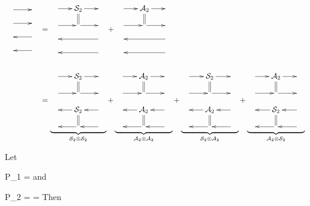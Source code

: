 \begin{align}
\bcen
\xymatrix@R=1pc{
\ar[r]&
\\
\ar[r]&
\\
&\ar[l]
\\
&\ar[l]
}
\ecen
&=
\bcen
\xymatrix@R=1pc@C=1.5pc{
\ar[r]&\cals_2
\ar@2{-}[d]\ar[r]&
\\
\ar[r]&\ar[r]&
\\
&&\ar[ll]
\\
&&\ar[ll]
}
\ecen
+
\bcen
\xymatrix@R=1pc@C=1.5pc{
\ar[r]&\cala_2
\ar@2{-}[d]\ar[r]&
\\
\ar[r]&\ar[r]&
\\
&&\ar[ll]
\\
&&\ar[ll]
}
\ecen
\\
\\
&=
\underbrace{\bcen
\xymatrix@R=1pc@C=1.5pc{
\ar[r]&\cals_2
\ar@2{-}[d]\ar[r]&
\\
\ar[r]&\ar[r]&
\\
&\cals_2\ar[l]
\ar@2{-}[d]&\ar[l]
\\
&\ar[l]&\ar[l]
}
\ecen}_{\cals_2\otimes\cals_2}
+
\underbrace{\bcen
\xymatrix@R=1pc@C=1.5pc{
\ar[r]&\cala_2
\ar@2{-}[d]\ar[r]&
\\
\ar[r]&\ar[r]&
\\
&\cala_2\ar[l]
\ar@2{-}[d]&\ar[l]
\\
&\ar[l]&\ar[l]
}
\ecen}_{\cala_2\otimes\cala_2}
+
\underbrace{\bcen
\xymatrix@R=1pc@C=1.5pc{
\ar[r]&\cals_2
\ar@2{-}[d]\ar[r]&
\\
\ar[r]&\ar[r]&
\\
&\cala_2\ar[l]
\ar@2{-}[d]&\ar[l]
\\
&\ar[l]&\ar[l]
}
\ecen}_{\cals_2\otimes\cala_2}
+
\underbrace{\bcen
\xymatrix@R=1pc@C=1.5pc{
\ar[r]&\cala_2
\ar@2{-}[d]\ar[r]&
\\
\ar[r]&\ar[r]&
\\
&\cals_2\ar[l]
\ar@2{-}[d]&\ar[l]
\\
&\ar[l]&\ar[l]
}
\ecen}_{\cala_2\otimes\cals_2}
\end{align}

Let

\beq
P_1 =
\bcen
{}
\ecen
\eeq
and

\beq
P_2 =
\bcen
{}
\ecen
=
\bcen
{}
\ecen
\label{eq-p2-double-swap}
\eeq
Then

